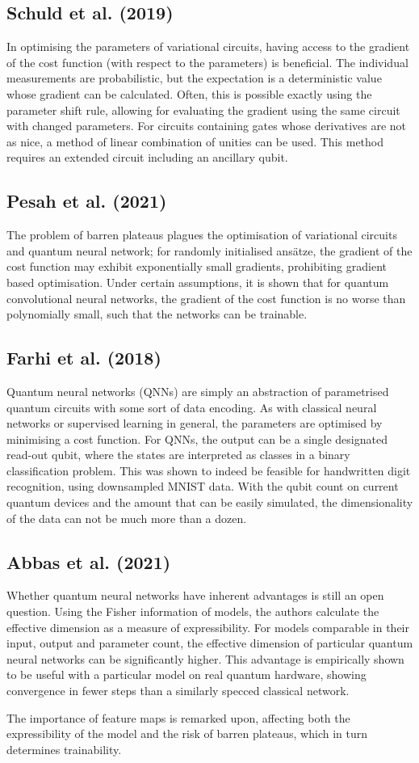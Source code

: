 \subsection{Schuld et al. (2019)}
In optimising the parameters of variational circuits, having access to the gradient  of the cost function (with respect to the parameters) is beneficial. The individual measurements are probabilistic, but the expectation is a deterministic value whose gradient can be calculated. Often, this is possible exactly using the parameter shift rule, allowing for evaluating the gradient using the same circuit with changed parameters. For circuits containing gates whose derivatives are not as nice, a method of linear combination of unities can be used. This method requires an extended circuit including an ancillary qubit.

\subsection{Pesah et al. (2021)}
The problem of barren plateaus plagues the optimisation of variational circuits and quantum neural network; for randomly initialised ansätze, the gradient of the cost function may exhibit exponentially small gradients, prohibiting gradient based optimisation. Under certain assumptions, it is shown that for quantum convolutional neural networks, the gradient of the cost function is no worse than polynomially small, such that the networks can be trainable.

\subsection{Farhi et al. (2018)}
Quantum neural networks (QNNs) are simply an abstraction of parametrised quantum circuits with some sort of data encoding. As with classical neural networks or supervised learning in general, the parameters are optimised by minimising a cost function. For QNNs, the output can be a single designated read-out qubit, where the states are interpreted as classes in a binary classification problem. This was shown to indeed be feasible for handwritten digit recognition, using downsampled MNIST data. With the qubit count on current quantum devices and the amount that can be easily simulated, the dimensionality of the data can not be much more than a dozen.


\subsection{Abbas et al. (2021)}
Whether quantum neural networks have inherent advantages is still an open question. Using the Fisher information of models, the authors calculate the effective dimension as a measure of expressibility. For models comparable in their input, output and parameter count, the effective dimension of particular quantum neural networks can be significantly higher. This advantage is empirically shown to be useful with a particular model on real quantum hardware, showing convergence in fewer steps than a similarly specced classical network.

The importance of feature maps is remarked upon, affecting both the expressibility of the model and the risk of barren plateaus, which in turn determines trainability.

